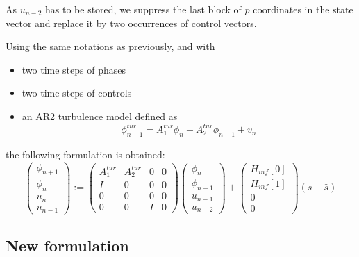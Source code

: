 \documentclass[a4,10pt]{article}
\begin{document}
As $u_{n-2}$ has to be stored, we suppress the last block of $p$
coordinates in the state vector and replace it by two occurrences of
control vectors.

Using the same notations as previously, and with
\begin{itemize}
\item two time steps of phases
\item two time steps of controls
\item an AR2 turbulence model defined as
\begin{equation}
\phi_{n+1}^{tur}=A_{1}^{tur}\phi_n+A_2^{tur}\phi_{n-1}+v_n
\end{equation}
\end{itemize}
the following formulation is obtained:
\begin{equation}
\begin{pmatrix}
\phi_{n+1} \\
\phi_n \\
u_n\\
u_{n-1} \end{pmatrix}
:=\begin{pmatrix}A^{tur}_1 &A^{tur}_2&0&0\\
I&0&0&0\\
0&0&0&0\\
0&0&I&0\end{pmatrix}\begin{pmatrix}
\phi_{n}\\
\phi_{n-1}\\
u_{n-1}\\
u_{n-2}\end{pmatrix}+\begin{pmatrix}H_{inf}[0]\\H_{inf}[1]\\0\\0\end{pmatrix}(s-\hat{s})
\label{eq:newform}
\end{equation}

\subsection{New formulation}
\end{document}
